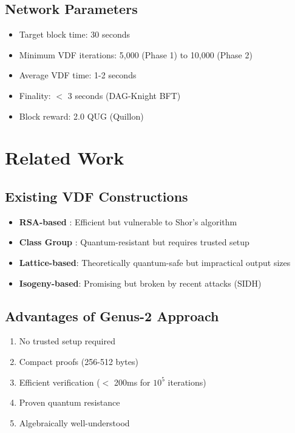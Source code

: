 \documentclass[11pt,a4paper]{article}
\begin{document}
\subsection{Network Parameters}

\begin{itemize}
    \item Target block time: 30 seconds
    \item Minimum VDF iterations: 5,000 (Phase 1) to 10,000 (Phase 2)
    \item Average VDF time: 1-2 seconds
    \item Finality: $<$ 3 seconds (DAG-Knight BFT)
    \item Block reward: 2.0 QUG (Quillon)
\end{itemize}

\section{Related Work}

\subsection{Existing VDF Constructions}

\begin{itemize}
    \item \textbf{RSA-based} \cite{boneh2018}: Efficient but vulnerable to Shor's algorithm
    \item \textbf{Class Group} \cite{wesolowski2019}: Quantum-resistant but requires trusted setup
    \item \textbf{Lattice-based}: Theoretically quantum-safe but impractical output sizes
    \item \textbf{Isogeny-based}: Promising but broken by recent attacks (SIDH)
\end{itemize}

\subsection{Advantages of Genus-2 Approach}

\begin{enumerate}
    \item No trusted setup required
    \item Compact proofs (256-512 bytes)
    \item Efficient verification ($<$ 200ms for $10^5$ iterations)
    \item Proven quantum resistance
    \item Algebraically well-understood
\end{enumerate}
\end{document}
